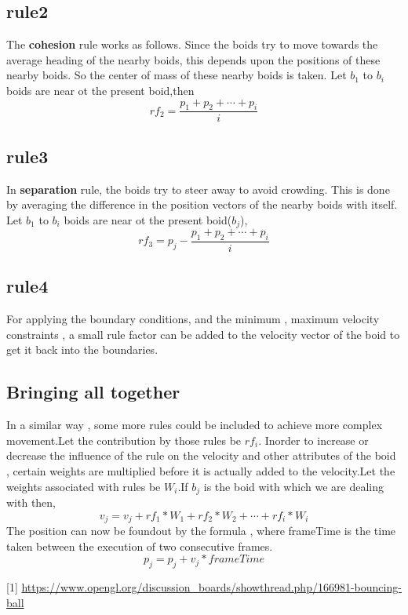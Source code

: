 \documentclass[a4paper]{article}
\begin{document}
\subsection{rule2}
The \textbf{cohesion} rule works as follows. Since the boids try to move towards the average heading of the nearby boids, this depends upon the positions of these nearby boids. So the center of mass of these nearby boids is taken.\newline
Let $b_1$ to $b_i$ boids are near ot the present boid,then
\[rf_2 = \frac{p_1 + p_2 + \cdots + p_i}{i}\]

\subsection{rule3}
In \textbf{separation} rule, the boids try to steer away to avoid crowding. This is done by averaging the difference in the position vectors of the nearby boids with itself.\newline
Let $b_1$ to $b_i$ boids are near ot the present boid($b_j$),
\[rf_3 = p_j- \frac{p_1 + p_2 + \cdots + p_i}{i}\]
\subsection{rule4}
For applying the boundary conditions, and the minimum , maximum velocity constraints , a small rule factor can be added to the velocity vector of the boid to get it back into the boundaries.
\subsection{Bringing all together}
In a similar way , some more rules could be included to achieve more complex movement.Let the contribution by those rules be $rf_i$.\newline
Inorder to increase or decrease the influence of the rule on the velocity and other attributes of the boid , certain weights are multiplied before it is actually added to the velocity.Let the weights associated with rules be $W_i$.If $b_j$ is the boid with which we are dealing with then,
\[v_j = v_j + rf_1 * W_1 + rf_2 * W_2 + \cdots + rf_i * W_i \]
The position can now be foundout by the formula , where frameTime is the time taken between the execution of two consecutive frames.
\[p_j = p_j + v_j * frameTime\]


[1] \url{https://www.opengl.org/discussion_boards/showthread.php/166981-bouncing-ball}
\end{document}
